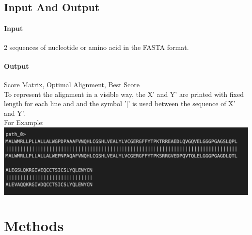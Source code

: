 \documentclass[a4paper, 12pt, one column]{article}
\begin{document}
\subsection{Input And Output}
\paragraph{Input}
2 sequences of nucleotide or amino acid in the FASTA format. \\
\paragraph{Output} Score Matrix, Optimal Alignment, Best Score\\
To represent the alignment in a visible way, the X' and Y' are printed with fixed length for each line and and the symbol '|' is used between the sequence of X' and Y'.\\
For Example:\\
\includegraphics[scale=0.5]{sample.png}
\section{Methods}
\end{document}
